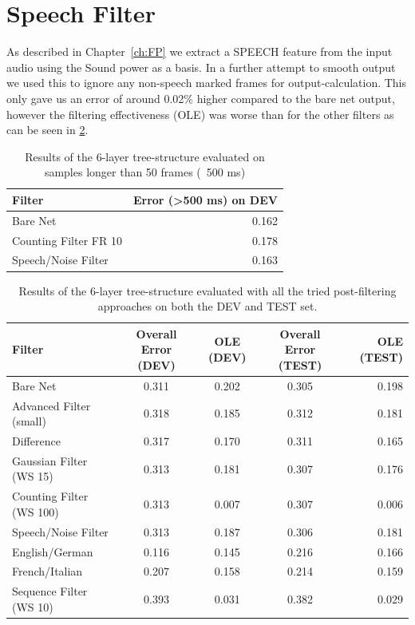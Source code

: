 \section{Speech Filter}
\label{sec:speech}

As described in Chapter~\ref{ch:FP} we extract a SPEECH feature from the input audio using the Sound power as a basis. In a further attempt to smooth output we used this to ignore any non-speech marked frames for output-calculation. This only gave us an error of around 0.02\% higher compared to the bare net output, however the filtering effectiveness (OLE) was worse than for the other filters as can be seen in \ref{tab:evalTotal}. 

\begin{table}[h!]
\caption{Results of the 6-layer tree-structure evaluated on samples longer than 50 frames (~500 ms)}
\label{tab:evalTotal2}
\centering
\begin{tabular}{| l | r |}
	\hline
	\textbf{Filter} & \textbf{Error (>500 ms) on DEV}  \\
	\hline
	 Bare Net & 0.162 \\
	\hline
	Counting Filter FR 10 & 0.178\\
	\hline
	Speech/Noise Filter & 0.163\\
	\hline
\end{tabular}
\end{table}


\begin{table}[h!]
\centering
\caption{Results of the 6-layer tree-structure evaluated with all the tried post-filtering approaches on both the DEV and TEST set.}
\label{tab:evalTotal}
\begin{tabular}{| l | c | c | c | r |}
	\hline
	\textbf{Filter} & \textbf{Overall Error (DEV)} & \textbf{OLE (DEV)} & \textbf{Overall Error (TEST)} & \textbf{OLE (TEST)}  \\
	\hline
	Bare Net & 0.311 & 0.202 & 0.305 & 0.198 \\
	\hline
	Advanced Filter (small) & 0.318 & 0.185 & 0.312 & 0.181 \\
	\hline
	Difference & 0.317 & 0.170 & 0.311 & 0.165 \\
	\hline
	Gaussian Filter (WS 15) & 0.313 & 0.181 & 0.307 & 0.176 \\
	\hline
	Counting Filter (WS 100) & 0.313 & 0.007 & 0.307 & 0.006 \\
	\hline
	Speech/Noise Filter  & 0.313 & 0.187 & 0.306 & 0.181 \\
	\hline
	English/German &  0.116 & 0.145 & 0.216 & 0.166 \\
	\hline
	French/Italian & 0.207 & 0.158 & 0.214 & 0.159 \\
	\hline
	Sequence Filter (WS 10) & 0.393 & 0.031 & 0.382 & 0.029 \\
	\hline
\end{tabular}

\end{table}

